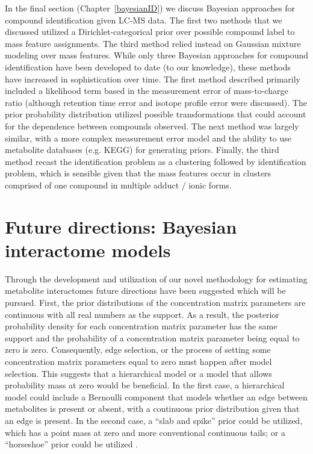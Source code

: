 \begin{DoubleSpace*}
In the final section (Chapter~\ref{bayesianID}) we discuss Bayesian approaches for compound identification given LC-MS data. The first two methods that we discussed utilized a Dirichlet-categorical prior over possible compound label to mass feature assignments. The third method relied instead on Gaussian mixture modeling over mass features. While only three Bayesian approaches for compound identification have been developed to date (to our knowledge), these methods have increased in sophistication over time. The first method described primarily included a likelihood term based in the measurement error of mass-to-charge ratio (although retention time error and isotope profile error were discussed). The prior probability distribution utilized possible transformations that could account for the dependence between compounds observed. The next method was largely similar, with a more complex measurement error model and the ability to use metabolite databases (e.g. KEGG) for generating priors. Finally, the third method recast the identification problem as a clustering followed by identification problem, which is sensible given that the mass features occur in clusters comprised of one compound in multiple adduct / ionic forms. 

\section{Future directions: Bayesian interactome models}
Through the development and utilization of our novel methodology for estimating metabolite interactomes future directions have been suggested which will be pursued. First, the prior distributions of the concentration matrix parameters are continuous with all real numbers as the support. As a result, the posterior probability density for each concentration matrix parameter has the same support and the probability of a concentration matrix parameter being equal to zero is zero. Consequently, edge selection, or the process of setting some concentration matrix parameters equal to zero must happen after model selection. This suggests that a hierarchical model or a model that allows probability mass at zero would be beneficial. In the first case, a hierarchical model could include a Bernoulli component that models whether an edge between metabolites is present or absent, with a continuous prior distribution given that an edge is present. In the second case, a ``slab and spike'' prior could be utilized, which has a point mass at zero and more conventional continuous tails; or a ``horseshoe'' prior could be utilized \cite{carvalho2010}. 


\end{DoubleSpace*}
